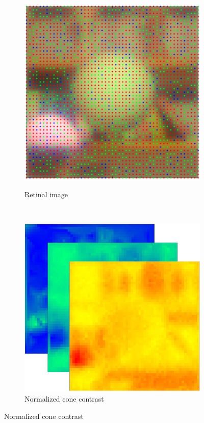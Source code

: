\documentclass{jov}
\begin{document}
\begin{figure}
\begin{subfigure}[b]{0.19 \textwidth}
        \label{fig:croppedImage}
    \end{subfigure}
    ~ 
    \begin{subfigure}[b]{0.19 \textwidth}
    \hspace{0.1 \textwidth}
        \caption{Retinal image}
        \vspace{2.5mm}
        \includegraphics[width=\textwidth]{../FiguresDraft5/Figure9/Figure9_c.png}
        \label{fig:croppedImageWithMosaic}
    \end{subfigure}
    ~
    \begin{subfigure}[b]{0.205 \textwidth}
        \caption{Normalized cone contrast}        
        \includegraphics[width=\textwidth]{../FiguresDraft5/Figure9/Figure9_d.png}

\end{subfigure}
\end{figure}
\end{document}
